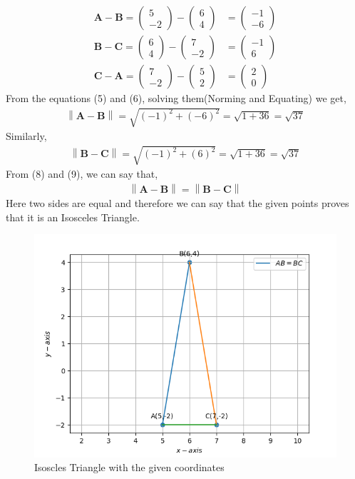 \documentclass[12pt]{article}
\providecommand{\norm}[1]{\left\lVert#1\right\rVert}
\newcommand{\myvec}[1]{\ensuremath{\begin{pmatrix}#1\end{pmatrix}}}
\let\vec\mathbf
\begin{document}
\begin{enumerate}
	\begin{align}
\vec{A}-\vec{B} = \myvec{5\\-2} - \myvec{6\\4} &= \myvec{-1\\-6} \\
\vec{B}-\vec{C} = \myvec{6\\4} - \myvec{7\\-2} &= \myvec{-1\\6} \\
\vec{C}-\vec{A} = \myvec{7\\-2} - \myvec{5\\2} &= \myvec{2\\0}
	\end{align}
From the equations (5) and (6), solving them(Norming and Equating) we get,
	\begin{align}
\norm{\vec{A}-\vec{B}} = \sqrt{(-1)^2+(-6)^2} = \sqrt{1+36} = \sqrt{37}
 	\end{align}
Similarly,
	\begin{align}
\norm{\vec{B}-\vec{C}} = \sqrt{(-1)^2+(6)^2} = \sqrt{1+36} = \sqrt{37} 
	\end{align}
From (8) and (9), we can say that,
	\begin{align}
\norm{\vec{A}-\vec{B}} = \norm{\vec{B}-\vec{C}} 
	\end{align}
Here two sides are equal and therefore we can say that the given points proves that it is an Isosceles Triangle.
\begin{figure}[!h]
	\begin{center} 
	    \includegraphics[width=\columnwidth]{figs/Vector2.png}
	\end{center}
\caption{Isoscles Triangle with the given coordinates}
\label{fig:Fig}
\end{figure}
\end{enumerate}
\end{document}
